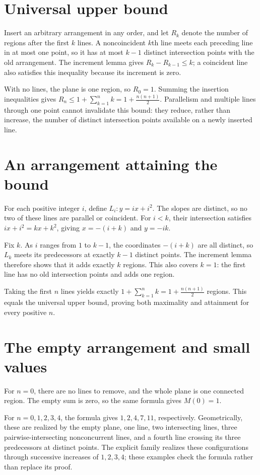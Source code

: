\documentclass[11pt]{article}
\begin{document}
\section{Universal upper bound}
Insert an arbitrary arrangement in any order, and let $R_k$ denote the number of regions after the first $k$ lines. A noncoincident $k$th line meets each preceding line in at most one point, so it has at most $k-1$ distinct intersection points with the old arrangement. The increment lemma gives $R_k-R_{k-1}\leq k$; a coincident line also satisfies this inequality because its increment is zero.

With no lines, the plane is one region, so $R_0=1$. Summing the insertion inequalities gives $R_n\leq 1+\sum_{k=1}^{n}k=1+\frac{n(n+1)}{2}$. Parallelism and multiple lines through one point cannot invalidate this bound: they reduce, rather than increase, the number of distinct intersection points available on a newly inserted line.

\section{An arrangement attaining the bound}
For each positive integer $i$, define $L_i:y=ix+i^2$. The slopes are distinct, so no two of these lines are parallel or coincident. For $i<k$, their intersection satisfies $ix+i^2=kx+k^2$, giving $x=-(i+k)$ and $y=-ik$.

Fix $k$. As $i$ ranges from $1$ to $k-1$, the coordinates $-(i+k)$ are all distinct, so $L_k$ meets its predecessors at exactly $k-1$ distinct points. The increment lemma therefore shows that it adds exactly $k$ regions. This also covers $k=1$: the first line has no old intersection points and adds one region.

Taking the first $n$ lines yields exactly $1+\sum_{k=1}^{n}k=1+\frac{n(n+1)}{2}$ regions. This equals the universal upper bound, proving both maximality and attainment for every positive $n$.

\section{The empty arrangement and small values}
For $n=0$, there are no lines to remove, and the whole plane is one connected region. The empty sum is zero, so the same formula gives $M(0)=1$.

For $n=0,1,2,3,4$, the formula gives $1,2,4,7,11$, respectively. Geometrically, these are realized by the empty plane, one line, two intersecting lines, three pairwise-intersecting nonconcurrent lines, and a fourth line crossing its three predecessors at distinct points. The explicit family realizes these configurations through successive increases of $1,2,3,4$; these examples check the formula rather than replace its proof.
\end{document}
